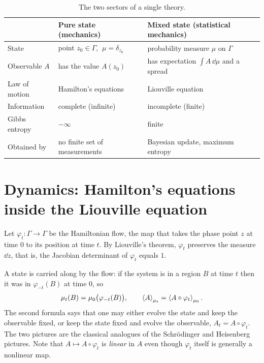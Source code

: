 \begin{table}[t]
\centering
\renewcommand{\arraystretch}{1.25}
\begin{tabular}{@{}p{2.7cm}p{5.4cm}p{6.1cm}@{}}
\toprule
 & Pure state (mechanics) & Mixed state (statistical mechanics)\\
\midrule
State & point $z_0\in\Gamma$, $\ \mu=\delta_{z_0}$ & probability measure $\mu$ on $\Gamma$\\
Observable $A$ & has the value $A(z_0)$ & has expectation $\int A\,\dd\mu$ and a spread\\
Law of motion & Hamilton's equations & Liouville equation\\
Information & complete (infinite) & incomplete (finite)\\
Gibbs entropy & $-\infty$ & finite\\
Obtained by & no finite set of measurements & Bayesian update, maximum entropy\\
\bottomrule
\end{tabular}
\caption{The two sectors of a single theory.}
\label{tab:sectors}
\end{table}

\section{Dynamics: Hamilton's equations inside the Liouville equation}
\label{sec:dynamics}

Let $\varphi_t:\Gamma\to\Gamma$ be the Hamiltonian flow, the map that takes the phase point $z$ at time $0$ to its position at time $t$. By Liouville's theorem, $\varphi_t$ preserves the measure $\dd z$, that is, the Jacobian determinant of $\varphi_t$ equals $1$.

A state is carried along by the flow: if the system is in a region $B$ at time $t$ then it was in $\varphi_{-t}(B)$ at time $0$, so
\begin{equation}
\mu_t(B)=\mu_0\bigl(\varphi_{-t}(B)\bigr),\qquad
\left\langle A\right\rangle_{\mu_t}=\left\langle A\circ\varphi_t\right\rangle_{\mu_0}.
\label{eq:pushforward}
\end{equation}
The second formula says that one may either evolve the state and keep the observable fixed, or keep the state fixed and evolve the observable, $A_t=A\circ\varphi_t$. The two pictures are the classical analogues of the Schr\"odinger and Heisenberg pictures. Note that $A\mapsto A\circ\varphi_t$ is \emph{linear} in $A$ even though $\varphi_t$ itself is generally a nonlinear map.

